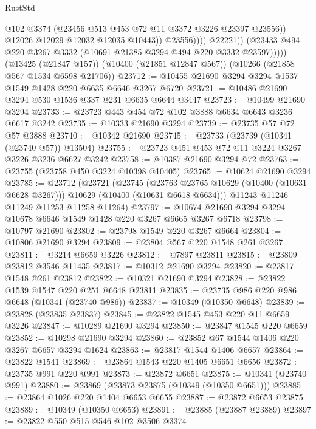 \begin{lexlean}{RustStd}
\begin{coremodule}
                            @102
                            @3374
                            (@23456 @513 @453 @72 @11 @3372 @3226 @23397 @23556))
                          @12026
                          @12029
                          @12032
                          @12035
                          @10443))
                      @23556))))
              @22221))
          (@23433 @494 @220 @3267 @3332 (@10691 @21385 @3294 @494 @220 @3332 @23597)))))
    (@13425 (@21847 @157))
    (@10400 (@21851 @12847 @567))
    (@10266 (@21858 @567 @1534 @6598 @21706))
@23712 := @10455 @21690 @3294 @3294 @1537 @1549 @1428 @220 @6635 @6646 @3267 @6720
@23721 := @10486 @21690 @3294 @530 @1536 @337 @231 @6635 @6644 @3447
@23723 := @10499 @21690 @3294
@23733 := @23723 @443 @454 @72 @102 @3888 @6634 @6643 @3236 @6617 @3242
@23735 := @10333 @21690 @3294
@23739 := @23735 @57 @72 @57 @3888
@23740 := @10342 @21690
@23745 := @23733 (@23739 (@10341 (@23740 @57)) @13504)
@23755 := @23723 @451 @453 @72 @11 @3224 @3267 @3226 @3236 @6627 @3242
@23758 := @10387 @21690 @3294 @72
@23763 := @23755 (@23758 @450 @3224 @10398 @10405)
@23765 := @10624 @21690 @3294
@23785 := @23712
    (@23721
      (@23745
        (@23763 @23765 @10629 (@10400 (@10631 @6628 @3267)))
        @10629
        (@10400 (@10631 @6618 @6634)))
      @11243
      @11246
      @11249
      @11253
      @11258
      @11264)
@23797 := @10674 @21690 @3294 @3294 @10678 @6646 @1549 @1428 @220 @3267 @6665 @3267 @6718
@23798 := @10797 @21690
@23802 := @23798 @1549 @220 @3267 @6664
@23804 := @10806 @21690 @3294
@23809 := @23804 @567 @220 @1548 @261 @3267
@23811 := @3214 @6659 @3226
@23812 := @7897 @23811
@23815 := @23809 @23812 @3546 @11435
@23817 := @10312 @21690 @3294
@23820 := @23817 @1548 @261 @23812
@23822 := @10321 @21690 @3294
@23828 := @23822 @1539 @1547 @220 @251 @6648 @23811
@23835 := @23735 @986 @220 @986 @6648 (@10341 (@23740 @986))
@23837 := @10349 (@10350 @6648)
@23839 := @23828 (@23835 @23837)
@23845 := @23822 @1545 @453 @220 @11 @6659 @3226
@23847 := @10289 @21690 @3294
@23850 := @23847 @1545 @220 @6659
@23852 := @10298 @21690 @3294
@23860 := @23852 @67 @1544 @1406 @220 @3267 @6657 @3294 @1624
@23863 := @23817 @1544 @1406 @6657
@23864 := @23822 @1541
@23869 := @23864 @1543 @220 @1405 @6651 @6656
@23872 := @23735 @991 @220 @991
@23873 := @23872 @6651
@23875 := @10341 (@23740 @991)
@23880 := @23869 (@23873 @23875 (@10349 (@10350 @6651)))
@23885 := @23864 @1026 @220 @1404 @6653 @6655
@23887 := @23872 @6653 @23875
@23889 := @10349 (@10350 @6653)
@23891 := @23885 (@23887 @23889)
@23897 := @23822 @550 @515 @546 @102 @3506 @3374

\end{coremodule}
\end{lexlean}
